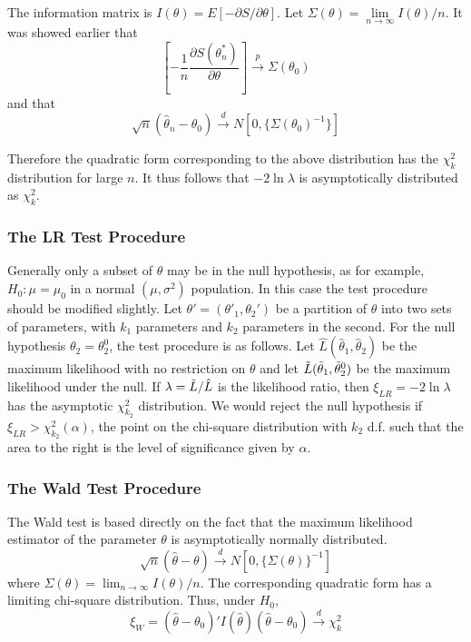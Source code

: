 \documentclass{article}
\begin{document}
The information matrix is \(I(\theta)=E[-\partial S/\partial \theta]\). Let \(\Sigma(\theta)=\lim\limits_{n \rightarrow \infty} I(\theta)/n\). It was showed earlier that
\begin{equation*}
    \left[-\frac{1}{n} \frac{\partial S(\theta_n^*)}{\partial \theta}\right] \stackrel{p} \longrightarrow \Sigma(\theta_0)
\end{equation*}
and that
\begin{equation*}
    \sqrt{n}(\hat{\theta}_n-\theta_0) \stackrel{d} \longrightarrow N[0,\{\Sigma(\theta_0)^{-1}\}]
\end{equation*}

Therefore the quadratic form corresponding to the above distribution has the \(\chi_k^2\) distribution for large $n$. It thus follows that \(-2\ln{\lambda}\) is asymptotically distributed as \(\chi_k^2\).

\subsubsection{The LR Test Procedure}

Generally only a subset of \(\theta\) may be in the null hypothesis, as for example, \(H_0:\mu=\mu_0\) in a normal \((\mu,\sigma^2)\) population. In this case the test procedure should be modified slightly. Let \(\theta'=(\theta'_1,\theta_2')\) be a partition of \(\theta\) into two sets of parameters, with \(k_1\) parameters and \(k_2\) parameters in the second. For the null hypothesis \(\theta_2=\theta_2^0\), the test procedure is as follows. Let \(\hat{L}(\hat{\theta}_1,\hat{\theta}_2)\) be the maximum likelihood with no restriction on \(\theta\) and let \(\Tilde{L}(\Tilde{\theta}_1,\Tilde{\theta}_2^0)\) be the maximum likelihood under the null. If \(\lambda=\Tilde{L}/\hat{L}\) is the likelihood ratio, then \(\xi_{LR}=-2 \ln{\lambda}\) has the asymptotic \(\chi_{k_2}^2\) distribution. We would reject the null hypothesis if \(\xi_{LR}>\chi_{k_2}^2(\alpha)\), the point on the chi-square distribution with \(k_2\) d.f. such that the area to the right is the level of significance given by $\alpha$.

\subsubsection{The Wald Test Procedure}

The Wald test is based directly on the fact that the maximum likelihood estimator of the parameter \(\theta\) is asymptotically normally distributed. 
\begin{equation*}
    \sqrt{n}(\hat{\theta}-\theta) \stackrel{d} \rightarrow N[0,\{\Sigma(\theta)\}^{-1}]
\end{equation*}
where \(\Sigma(\theta)=\lim_{n \rightarrow \infty} I(\theta)/n\). The corresponding quadratic form has a limiting chi-square distribution. Thus, under \(H_0\),
\begin{equation*}
    \xi_W=(\hat{\theta}-\theta_0)'I(\hat{\theta})(\hat{\theta}-\theta_0) \stackrel{d} \rightarrow \chi_k^2
\end{equation*}
\end{document}
